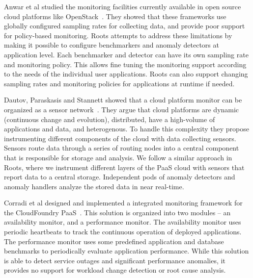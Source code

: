 Anwar et al studied the monitoring facilities currently available in
open source cloud platforms like OpenStack~\cite{Anwar:2015:ACM:2797022.2797039}. 
They showed that these
frameworks use globally configured sampling rates for collecting data,
and provide poor support for policy-based monitoring. Roots attempts
to address these limitations by making it possible to configure
benchmarkers and anomaly detectors at application level. Each benchmarker 
and detector can have its own sampling rate and monitoring policy.
This allows fine tuning the monitoring support according to the
needs of the individual user applications.
Roots can also support changing sampling rates and monitoring
policies for applications at runtime if needed.

Dautov, Paraskasis and Stannett showed that a cloud platform monitor
can be organized as a sensor network~\cite{Dautov2014}. 
They argue that cloud platforms are 
dynamic (continuous change and evolution), distributed, have a high-volume
of applications and data, and heterogenous. To handle this complexity
they propose instrumenting different components of the cloud with
data collecting sensors. Sensors route data through a series of routing 
nodes into a central component that is responsible for storage
and analysis. We follow a similar approach in Roots, where we
instrument different layers of the PaaS cloud with sensors that
report data to a central storage. Independent pods of anomaly
detectors and anomaly handlers analyze the stored data in near
real-time.

Corradi et al designed and implemented a integrated monitoring
framework for the CloudFoundry PaaS~\cite{6912627}. This solution is organized
into two modules -- an availability monitor, and a performance
monitor. The availability monitor uses periodic heartbeats to
track the continuous operation of deployed applications. The
performance monitor uses some predefined application and
database benchmarks to periodically evaluate application performance.
While this solution is able to detect service outages and significant
performance anomalies, it provides no support for workload change
detection or root cause analysis.

